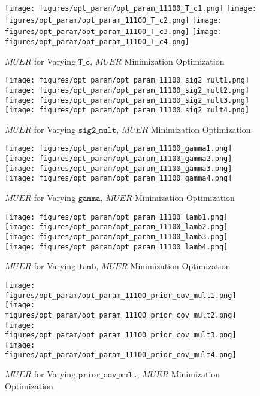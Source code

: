 	\begin{figure}[H]
	\texttt{[image: figures/opt\_param/opt\_param\_11100\_T\_c1.png]}%
	\texttt{[image: figures/opt\_param/opt\_param\_11100\_T\_c2.png]}%
	\texttt{[image: figures/opt\_param/opt\_param\_11100\_T\_c3.png]}%
	\texttt{[image: figures/opt\_param/opt\_param\_11100\_T\_c4.png]}%
	\caption{$MUER$ for Varying $\mathtt{T\_c}$, $MUER$ Minimization Optimization}
	\end{figure}

	\begin{figure}[H]
	\texttt{[image: figures/opt\_param/opt\_param\_11100\_sig2\_mult1.png]}%
	\texttt{[image: figures/opt\_param/opt\_param\_11100\_sig2\_mult2.png]}%
	\texttt{[image: figures/opt\_param/opt\_param\_11100\_sig2\_mult3.png]}%
	\texttt{[image: figures/opt\_param/opt\_param\_11100\_sig2\_mult4.png]}%
	\caption{$MUER$ for Varying $\mathtt{sig2\_mult}$, $MUER$ Minimization Optimization}
	\end{figure}

	\begin{figure}[H]
	\texttt{[image: figures/opt\_param/opt\_param\_11100\_gamma1.png]}%
	\texttt{[image: figures/opt\_param/opt\_param\_11100\_gamma2.png]}%
	\texttt{[image: figures/opt\_param/opt\_param\_11100\_gamma3.png]}%
	\texttt{[image: figures/opt\_param/opt\_param\_11100\_gamma4.png]}%
	\caption{$MUER$ for Varying $\mathtt{gamma}$, $MUER$ Minimization Optimization}
	\end{figure}

	\begin{figure}[H]
	\texttt{[image: figures/opt\_param/opt\_param\_11100\_lamb1.png]}%
	\texttt{[image: figures/opt\_param/opt\_param\_11100\_lamb2.png]}%
	\texttt{[image: figures/opt\_param/opt\_param\_11100\_lamb3.png]}%
	\texttt{[image: figures/opt\_param/opt\_param\_11100\_lamb4.png]}%
	\caption{$MUER$ for Varying $\mathtt{lamb}$, $MUER$ Minimization Optimization}
	\end{figure}

	\begin{figure}[H]
	\texttt{[image: figures/opt\_param/opt\_param\_11100\_prior\_cov\_mult1.png]}%
	\texttt{[image: figures/opt\_param/opt\_param\_11100\_prior\_cov\_mult2.png]}%
	\texttt{[image: figures/opt\_param/opt\_param\_11100\_prior\_cov\_mult3.png]}%
	\texttt{[image: figures/opt\_param/opt\_param\_11100\_prior\_cov\_mult4.png]}%
	\caption{$MUER$ for Varying $\mathtt{prior\_cov\_mult}$, $MUER$ Minimization Optimization}
	\end{figure}

